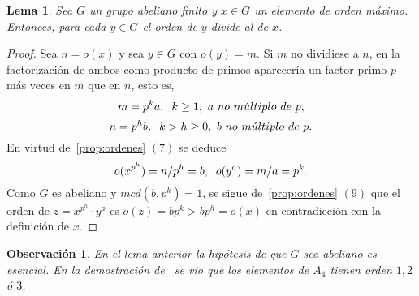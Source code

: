 \documentclass[12pt]{article}
\newtheorem{lemma}{Lema}[theorem]
\newtheorem{observation}{Observación}[theorem]
\begin{document}
\begin{lemma}\label{lem:preEst2} Sea $G$ un grupo abeliano finito y $x \in G$ un elemento de orden máximo. Entonces, para cada $y \in G$ el orden de $y$ divide al de $x$.
\end{lemma}
\begin{proof}
Sea $n=o(x)$ y sea $y \in G$ con $o(y) = m$. Si $m$ no dividiese a $n$, en la factorización de ambos como producto de primos aparecería un factor primo $p$ más veces en $m$ que en $n$, esto es, $$m = p^ka, \hspace{0.2cm} k \geq 1,~a~no~m\acute{u}ltiplo~de~p,$$ $$n = p^hb, \hspace{0.2cm} k >h \geq 0,~b~no~m\acute{u}ltiplo~de~p.$$ En virtud de~\ref{prop:ordenes} $(7)$ se deduce $$o(x^{p^h}) = n/p^h = b, \hspace{0.2cm} o(y^a) = m/a =p^k.$$ Como $G$ es abeliano y $mcd(b,p^k) = 1$, se sigue de~\ref{prop:ordenes} $(9)$ que el orden de $z = x^{p^h} \cdot y^a$ es $o(z) = bp^k >bp^h = o(x)$ en contradicción con la definición de $x$.

\end{proof}

\begin{observation}En el lema anterior la hipótesis de que $G$ sea abeliano es esencial. En la demostración de~ se vio que los elementos de $A_4$ tienen orden $1, 2$ ó $3$.
\end{observation}
\end{document}
